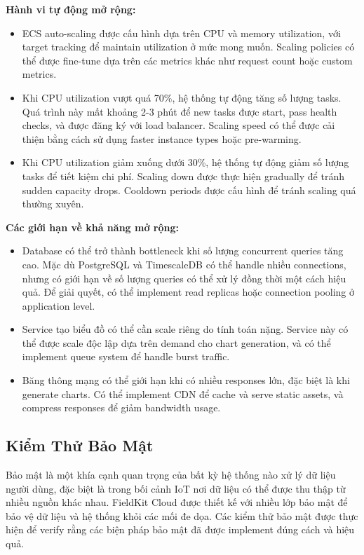 \textbf{Hành vi tự động mở rộng:}
\begin{itemize}
    \item ECS auto-scaling được cấu hình dựa trên CPU và memory utilization, với target tracking để maintain utilization ở mức mong muốn. Scaling policies có thể được fine-tune dựa trên các metrics khác như request count hoặc custom metrics.
    
    \item Khi CPU utilization vượt quá 70\%, hệ thống tự động tăng số lượng tasks. Quá trình này mất khoảng 2-3 phút để new tasks được start, pass health checks, và được đăng ký với load balancer. Scaling speed có thể được cải thiện bằng cách sử dụng faster instance types hoặc pre-warming.
    
    \item Khi CPU utilization giảm xuống dưới 30\%, hệ thống tự động giảm số lượng tasks để tiết kiệm chi phí. Scaling down được thực hiện gradually để tránh sudden capacity drops. Cooldown periods được cấu hình để tránh scaling quá thường xuyên.
\end{itemize}

\textbf{Các giới hạn về khả năng mở rộng:}
\begin{itemize}
    \item Database có thể trở thành bottleneck khi số lượng concurrent queries tăng cao. Mặc dù PostgreSQL và TimescaleDB có thể handle nhiều connections, nhưng có giới hạn về số lượng queries có thể xử lý đồng thời một cách hiệu quả. Để giải quyết, có thể implement read replicas hoặc connection pooling ở application level.
    
    \item Service tạo biểu đồ có thể cần scale riêng do tính toán nặng. Service này có thể được scale độc lập dựa trên demand cho chart generation, và có thể implement queue system để handle burst traffic.
    
    \item Băng thông mạng có thể giới hạn khi có nhiều responses lớn, đặc biệt là khi generate charts. Có thể implement CDN để cache và serve static assets, và compress responses để giảm bandwidth usage.
\end{itemize}

\subsection{Kiểm Thử Bảo Mật}

Bảo mật là một khía cạnh quan trọng của bất kỳ hệ thống nào xử lý dữ liệu người dùng, đặc biệt là trong bối cảnh IoT nơi dữ liệu có thể được thu thập từ nhiều nguồn khác nhau. FieldKit Cloud được thiết kế với nhiều lớp bảo mật để bảo vệ dữ liệu và hệ thống khỏi các mối đe dọa. Các kiểm thử bảo mật được thực hiện để verify rằng các biện pháp bảo mật đã được implement đúng cách và hiệu quả.

